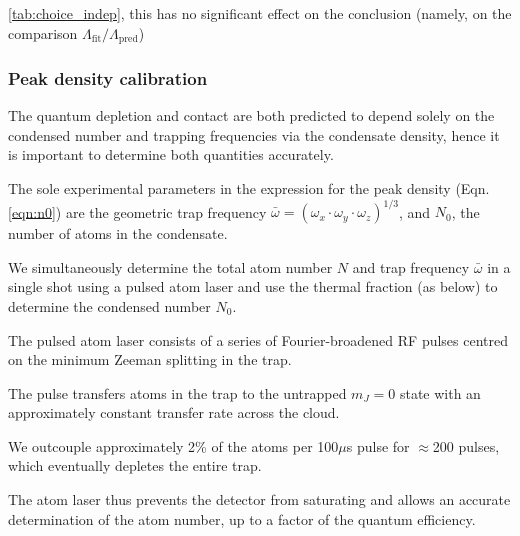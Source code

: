 	\ref{tab:choice_indep}, this has no significant effect on the conclusion (namely, on the comparison $\Lambda_\textrm{fit}/\Lambda_\textrm{pred}$)
	



\subsubsection{Peak density calibration}

    The quantum depletion and contact are both predicted to depend solely on the condensed number and trapping frequencies via the condensate density, hence it is important to determine both quantities accurately.
	
	
    The sole experimental parameters in the expression for the peak density (Eqn.
	\ref{eqn:n0}) are the geometric trap frequency $\bar{\omega} = \left(\omega_x\cdot\omega_y\cdot\omega_z\right)^{1/3}$, and $N_0$, the number of atoms in the condensate.
	
    We simultaneously determine the total atom number $N$ and trap frequency $\bar{\omega}$ in a single shot using a pulsed atom laser and use the thermal fraction (as below) to determine the condensed number $N_0$.
	

	The pulsed atom laser consists of a series of Fourier-broadened RF pulses centred on the minimum Zeeman splitting in the trap.
	
	The pulse transfers atoms in the trap to the untrapped $m_J=0$ state with an approximately constant transfer rate across the cloud.
	
	We outcouple approximately 2\% of the atoms per 100$\mu$s pulse for $\approx$200 pulses, which eventually depletes the entire trap.
	
	The atom laser thus prevents the detector from saturating and allows an accurate determination of the atom number, up to a factor of the quantum efficiency.
	
